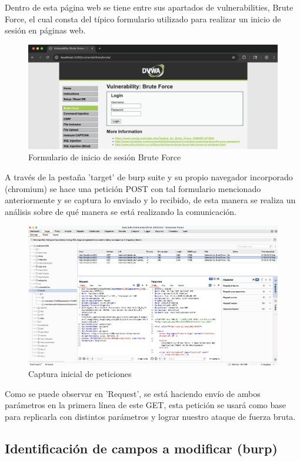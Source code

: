 \documentclass[letter,12pt]{article}
\begin{document}
Dentro de esta página web se tiene entre sus apartados de vulnerabilities, Brute Force, el cual consta del típico formulario utilizado para realizar un inicio de sesión en páginas web.
\begin{figure}[H]
    \centering
    \includegraphics[width=0.75\linewidth]{Imagenes/brute_force_form.png}
    \caption{Formulario de inicio de sesión Brute Force}
    \label{fig:placeholder}
\end{figure}

A través de la pestaña 'target' de burp suite y su propio navegador incorporado (chromium) se hace una petición POST con tal formulario mencionado anteriormente y se captura lo enviado y lo recibido, de esta manera se realiza un análisis sobre de qué manera se está realizando la comunicación.
\begin{figure}[H]
    \centering
    \includegraphics[width=1\linewidth]{Imagenes/brute_force_inicial_capture.png}
    \caption{Captura inicial de peticiones}
    \label{fig:placeholder}
\end{figure}

Como se puede observar en 'Request', se está haciendo envío de ambos parámetros en la primera línea de este GET, esta petición se usará como base para replicarla con distintos parámetros y lograr nuestro ataque de fuerza bruta.

\subsection{Identificación de campos a modificar (burp)}
\end{document}
